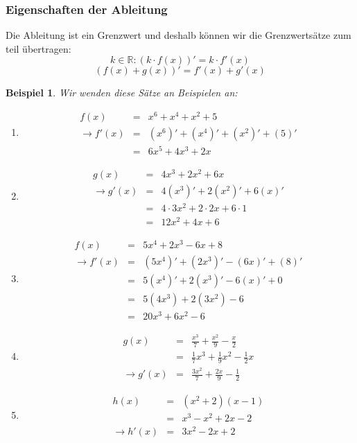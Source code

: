 \documentclass{report}
\newtheorem{myexample}{Beispiel}
\begin{document}
\subsubsection{Eigenschaften der Ableitung}
Die Ableitung ist ein Grenzwert und deshalb können wir die Grenzwertsätze zum teil übertragen:
\begin{equation*}k \in \mathbb{R}: (k \cdot f(x))' = k \cdot f'(x)\end{equation*}
\begin{equation*}(f(x) + g(x))' = f'(x) + g'(x)\end{equation*}
\begin{myexample}Wir wenden diese Sätze an Beispielen an:
\begin{enumerate}
\item
\begin{eqnarray*}
	f(x)&=& x^6 + x^4 + x^2 + 5\\
	\to f'(x) &=&  (x^6)'+(x^4)'+(x^2)'+(5)'\\
	 &=& 6x^5 + 4x^3 + 2x 
\end{eqnarray*}
\item
\begin{eqnarray*}
	g(x) &=& 4x^3 + 2x^2 + 6x\\
	\to g'(x) &=& 4(x^3)' + 2(x^2)' + 6(x)'\\
	&=& 4 \cdot 3x^2 + 2 \cdot 2x +6 \cdot 1\\
	&=& 12x^2 + 4x + 6
\end{eqnarray*}
\item 
\begin{eqnarray*}
f(x) & = & 5x^4 + 2x^3 - 6x + 8 \nonumber \\
\to f'(x) & = & (5x^4)' + (2x^3)' - (6x)' + (8)' \nonumber \\
& = & 5(x^4)' + 2(x^3)' - 6(x)' + 0 \nonumber \\
& = & 5(4x^3) + 2(3x^2) - 6 \nonumber \\
& = & 20x^3 + 6x^2 - 6
\end{eqnarray*}
\item \begin{eqnarray}g(x) & = & \frac{x^3}{7} + \frac{x^2}{9} - \frac{x}{2} \nonumber \\
& = & \frac{1}{7}x^3 + \frac{1}{9}x^2 - \frac{1}{2}x \nonumber \\
\to g'(x) & = & \frac{3x^2}{7} + \frac{2x}{9} - \frac{1}{2}\end{eqnarray}
\item
\begin{eqnarray*}
	h(x) &=& (x^2+2)(x-1)\\
	&=& x^3 -x^2 + 2x -2\\
	\to h'(x) &=& 3x^2 -2x + 2
\end{eqnarray*}
\end{enumerate}
\end{myexample}
\end{document}
